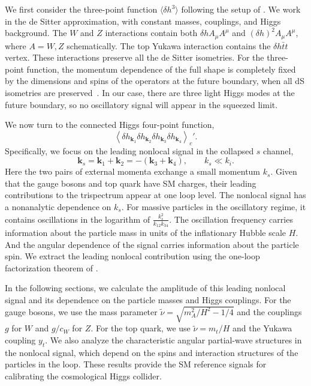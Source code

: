 \documentclass[a4paper,12pt]{article}
\def\mb{\mathbf}
\begin{document}
We first consider the three-point function $\langle\delta h^3\rangle$ following the setup of \cite{lu_cosmological_2020}.
We work in the de Sitter approximation, with constant masses, couplings, and Higgs background.
The $W$ and $Z$ interactions contain both $\delta h A_\mu A^\mu$ and $(\delta h)^2 A_\mu A^\mu$, where $A=W,Z$ schematically.
The top Yukawa interaction contains the $\delta h\bar t t$ vertex.
These interactions preserve all the de Sitter isometries.
For the three-point function, the momentum dependence of the full shape is completely fixed by the dimensions and spins of the operators at the future boundary, when all dS isometries are preserved~\cite{wang_interact_2025}.
In our case, there are three light Higgs modes at the future boundary, so no oscillatory signal will appear in the squeezed limit.

We now turn to the connected Higgs four-point function,
\begin{equation}
    \left\langle\delta h_{\mb k_1}\delta h_{\mb k_2}
    \delta h_{\mb k_3}\delta h_{\mb k_4}\right\rangle_c'.
    \label{eq:overview-four-point}
\end{equation}
Specifically, we focus on the leading nonlocal signal in the collapsed $s$ channel,
\begin{equation}
    \mb k_s=\mb k_1+\mb k_2=-(\mb k_3+\mb k_4),
    \qquad k_s\ll k_i.
    \label{eq:overview-collapsed-channel}
\end{equation}
Here the two pairs of external momenta exchange a small momentum $k_s$.
Given that the gauge bosons and top quark have SM charges, their leading contributions to the trispectrum appear at one loop level.
The nonlocal signal has a nonanalytic dependence on $k_s$.
For massive particles in the oscillatory regime, it contains oscillations in the logarithm of $\frac{k_s^2}{k_{12}k_{34}}$.
The oscillation frequency carries information about the particle mass in units of the inflationary Hubble scale $H$.
And the angular dependence of the signal carries information about the particle spin.
We extract the leading nonlocal contribution using the one-loop factorization theorem of \cite{qin_inflation_2023}.

In the following sections, we calculate the amplitude of this leading nonlocal signal and its dependence on the particle masses and Higgs couplings.
For the gauge bosons, we use the mass parameter $\tilde\nu=\sqrt{m_A^2/H^2-1/4}$ and the couplings $g$ for $W$ and $g/c_W$ for $Z$.
For the top quark, we use $\tilde\nu=m_t/H$ and the Yukawa coupling $y_t$.
We also analyze the characteristic angular partial-wave structures in the nonlocal signal, which depend on the spins and interaction structures of the particles in the loop.
These results provide the SM reference signals for calibrating the cosmological Higgs collider.
\end{document}
